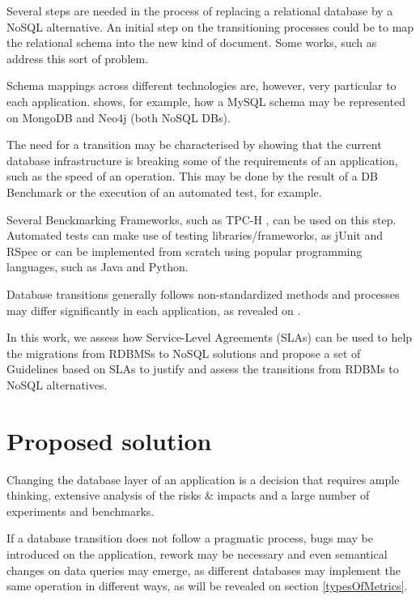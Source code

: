 Several steps are needed in the process of replacing a relational database by a NoSQL alternative. An initial step on the transitioning processes could be to map the relational schema into the new kind of document. Some works, such as \cite{lombardo2012issues} \cite{zhu2012data} address this sort of problem. 

Schema mappings across different technologies are, however, very particular to each application. \cite{bahl2014mysql} shows, for example, how a MySQL schema may be represented on MongoDB and Neo4j (both NoSQL DBs).

The need for a transition may be characterised by showing that the current database infrastructure is breaking some of the requirements of an application, such as the speed of an operation. This may be done by the result of a DB Benchmark or the execution of an automated test, for example. 

Several Benckmarking Frameworks, such as TPC-H \cite{council2008tpc}, can be used on this step. Automated tests can make use of testing libraries/frameworks, as jUnit \cite{massol2003junit} and RSpec \cite{chelimsky2010rspec} or can be implemented from scratch using popular programming languages, such as Java and Python.

Database transitions generally follows non-standardized methods and processes may differ significantly in each application, as revealed on \cite{fabioMartinSM}.

In this work, we assess how Service-Level Agreements (SLAs) can be used to help the migrations from RDBMSs to NoSQL solutions and propose a set of Guidelines based on SLAs to justify and assess the transitions from RDBMs to NoSQL alternatives.



\section{Proposed solution}

Changing the database layer of an application is a decision that requires ample thinking, extensive analysis of the risks \& impacts and a large number of experiments and benchmarks. 

If a database transition does not follow a pragmatic process, bugs may be introduced on the application, rework may be necessary and even semantical changes on data queries may emerge, as different databases may implement the same operation in  different ways, as will be revealed on section \ref{typesOfMetrics}.

